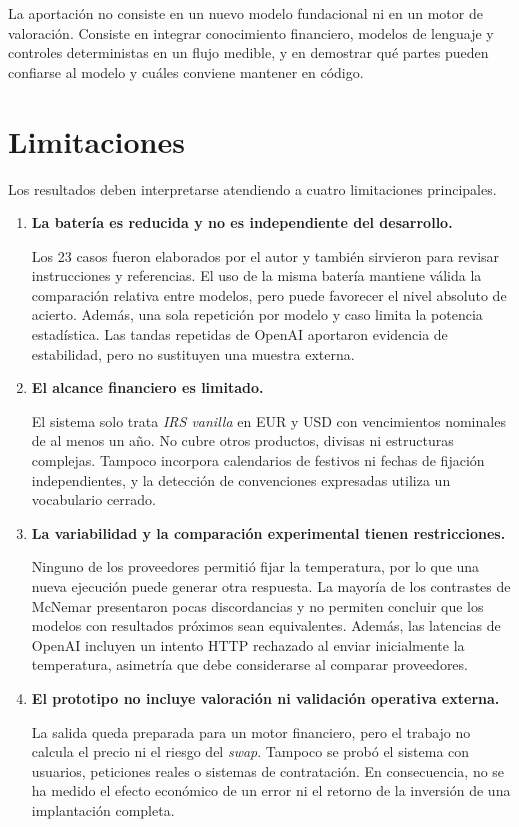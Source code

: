 La aportación no consiste en un nuevo modelo fundacional ni en un motor de valoración. Consiste en integrar conocimiento financiero, modelos de lenguaje y controles deterministas en un flujo medible, y en demostrar qué partes pueden confiarse al modelo y cuáles conviene mantener en código.

\section{Limitaciones}
\label{sec:limitaciones}

Los resultados deben interpretarse atendiendo a cuatro limitaciones principales.

\begin{enumerate}
    \item \textbf{La batería es reducida y no es independiente del desarrollo.}

    Los 23 casos fueron elaborados por el autor y también sirvieron para revisar instrucciones y referencias. El uso de la misma batería mantiene válida la comparación relativa entre modelos, pero puede favorecer el nivel absoluto de acierto. Además, una sola repetición por modelo y caso limita la potencia estadística. Las tandas repetidas de OpenAI aportaron evidencia de estabilidad, pero no sustituyen una muestra externa.

    \item \textbf{El alcance financiero es limitado.}

    El sistema solo trata \textit{IRS vanilla} en EUR y USD con vencimientos nominales de al menos un año. No cubre otros productos, divisas ni estructuras complejas. Tampoco incorpora calendarios de festivos ni fechas de fijación independientes, y la detección de convenciones expresadas utiliza un vocabulario cerrado.

    \item \textbf{La variabilidad y la comparación experimental tienen restricciones.}

    Ninguno de los proveedores permitió fijar la temperatura, por lo que una nueva ejecución puede generar otra respuesta. La mayoría de los contrastes de McNemar presentaron pocas discordancias y no permiten concluir que los modelos con resultados próximos sean equivalentes. Además, las latencias de OpenAI incluyen un intento HTTP rechazado al enviar inicialmente la temperatura, asimetría que debe considerarse al comparar proveedores.

    \item \textbf{El prototipo no incluye valoración ni validación operativa externa.}

    La salida queda preparada para un motor financiero, pero el trabajo no calcula el precio ni el riesgo del \textit{swap}. Tampoco se probó el sistema con usuarios, peticiones reales o sistemas de contratación. En consecuencia, no se ha medido el efecto económico de un error ni el retorno de la inversión de una implantación completa.
\end{enumerate}

